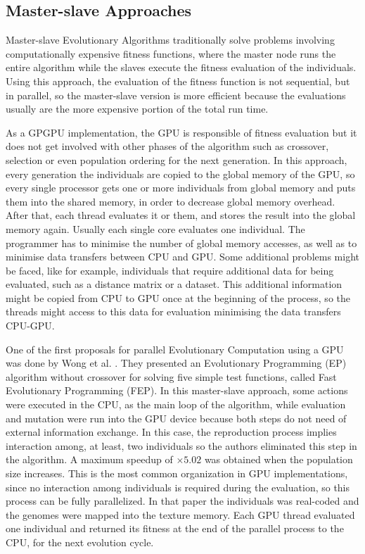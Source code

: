 \documentclass[review]{elsarticle}
\begin{document}
\subsection{Master-slave Approaches}
\label{sec:masterSlave}

Master-slave Evolutionary Algorithms traditionally solve problems involving computationally expensive fitness functions, where the master node runs the entire algorithm while the slaves execute the fitness evaluation of the individuals. Using this approach, the evaluation of the fitness function is not sequential, but in parallel, so the master-slave version is more efficient because the evaluations usually are the more expensive portion of the total run time.

As a GPGPU implementation, the GPU is responsible of fitness evaluation but it does not get involved with other phases of the algorithm such as crossover, selection or even population ordering for the next generation. In this approach, every generation the individuals are copied to the global memory of the GPU, so every single processor gets one or more individuals from global memory and puts them into the shared memory, in order to decrease global memory overhead. After that, each thread evaluates it or them, and stores the result into the global memory again. Usually each single core evaluates one individual. The programmer has to minimise the number of global memory accesses, as well as to minimise data transfers between CPU and GPU. Some additional problems might be faced, like for example, individuals that require additional data for being evaluated, such as a distance matrix or a dataset. This additional information might be copied from CPU to GPU once at the beginning of the process, so the threads might access to this data for evaluation minimising the data transfers CPU-GPU. 

One of the first proposals for parallel Evolutionary Computation using a GPU was done by Wong et al. \cite{man-leung-wong-parallel-2005}. They presented an Evolutionary Programming (EP) algorithm without crossover for solving five simple test functions, called Fast Evolutionary Programming (FEP). In this master-slave approach, some actions were executed in the CPU, as the main loop of the algorithm, while evaluation and mutation were run into the GPU device because both steps do not need of external information exchange. In this case, the reproduction process implies interaction among, at least, two individuals so the authors eliminated this step in the algorithm. A maximum speedup of $\times5.02$ was obtained when the population size increases. This is the most common organization in GPU implementations, since no interaction among individuals is required during the evaluation, so this process can be fully parallelized. In that paper the individuals was real-coded and the genomes were mapped into the texture memory. Each GPU thread evaluated one individual and returned its fitness at the end of the parallel process to the CPU, for the next evolution cycle.
\end{document}
